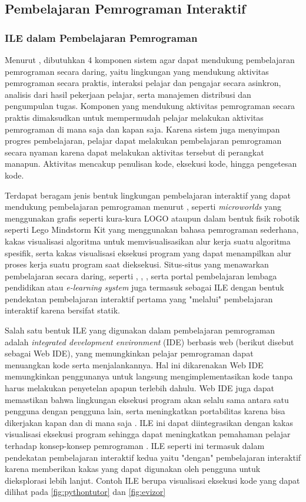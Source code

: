 \subsection{Pembelajaran Pemrograman Interaktif}
\subsubsection{ILE dalam Pembelajaran Pemrograman}
Menurut \textcite{choy2004interactive}, dibutuhkan 4 komponen sistem agar dapat mendukung pembelajaran pemrograman secara daring, yaitu lingkungan yang mendukung aktivitas pemrograman secara praktis, interaksi pelajar dan pengajar secara asinkron, analisis dari hasil pekerjaan pelajar, serta manajemen distribusi dan pengumpulan tugas. Komponen yang mendukung aktivitas pemrograman secara praktis dimaksudkan untuk mempermudah pelajar melakukan aktivitas pemrograman di mana saja dan kapan saja. Karena sistem juga menyimpan progres pembelajaran, pelajar dapat melakukan pembelajaran pemrograman secara nyaman karena dapat melakukan aktivitas tersebut di perangkat manapun. Aktivitas mencakup penulisan kode, eksekusi kode, hingga pengetesan kode.

Terdapat beragam jenis bentuk lingkungan pembelajaran interaktif yang dapat mendukung pembelajaran pemrograman menurut \textcite{moons2013pilot}, seperti \textit{microworlds} yang menggunakan grafis seperti kura-kura LOGO ataupun dalam bentuk fisik robotik seperti Lego Mindstorm Kit yang menggunakan bahasa pemrograman sederhana, kakas visualisasi algoritma untuk memvisualisasikan alur kerja suatu algoritma spesifik, serta kakas visualisasi eksekusi program yang dapat menampilkan alur proses kerja suatu program saat dieksekusi. Situs-situs yang menawarkan pembelajaran secara daring, seperti \textcite{sololearn2021media}, \textcite{codesaya2021media}, \textcite{brilliant2021media}, serta portal pembelajaran lembaga pendidikan atau \textit{e-learning system} juga termasuk sebagai ILE dengan bentuk pendekatan pembelajaran interaktif pertama yang "melalui" pembelajaran interaktif karena bersifat statik.

Salah satu bentuk ILE yang digunakan dalam pembelajaran pemrograman adalah \textit{integrated development environment} (IDE) berbasis web (berikut disebut sebagai Web IDE), yang memungkinkan pelajar pemrograman dapat menuangkan kode serta menjalankannya. Hal ini dikarenakan Web IDE memungkinkan penggunanya untuk langsung mengimplementasikan kode tanpa harus melakukan penyetelan apapun terlebih dahulu. Web IDE juga dapat memastikan bahwa lingkungan eksekusi program akan selalu sama antara satu pengguna dengan pengguna lain, serta meningkatkan portabilitas karena bisa dikerjakan kapan dan di mana saja \parencite{tran2013interactive}. ILE ini dapat diintegrasikan dengan kakas visualisasi eksekusi program sehingga dapat meningkatkan pemahaman pelajar terhadap konsep-konsep pemrograman \parencite{moons2013pilot}. ILE seperti ini termasuk dalam pendekatan pembelajaran interaktif kedua yaitu "dengan" pembelajaran interaktif karena memberikan kakas yang dapat digunakan oleh pengguna untuk dieksplorasi lebih lanjut. Contoh ILE berupa visualisasi eksekusi kode yang dapat dilihat pada \autoref{fig:pythontutor} dan \autoref{fig:evizor}

